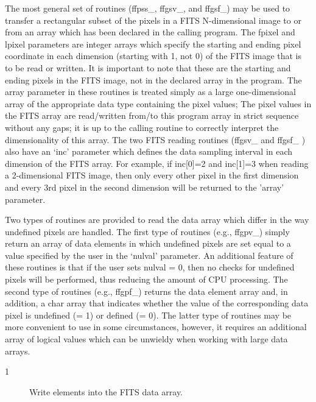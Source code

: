 \documentclass[11pt]{book}
\begin{document}
The most general set of routines (ffpss\_, ffgsv\_, and ffgsf\_) may be
used to transfer a rectangular subset of the pixels in a FITS
N-dimensional image to or from an array which has been declared in the
calling program.  The fpixel and lpixel parameters are integer arrays
which specify the starting and ending pixel coordinate in each dimension
(starting with 1, not 0) of the FITS image that is to be read or
written.  It is important to note that these are the starting and
ending pixels in the FITS image, not in the declared array in the
program. The array parameter in these routines is treated simply as a
large one-dimensional array of the appropriate data type containing the
pixel values; The pixel values in the FITS array are read/written
from/to this program array in strict sequence without any gaps;  it is
up to the calling routine to correctly interpret the dimensionality of
this array.  The two FITS reading routines (ffgsv\_ and ffgsf\_ ) also
have an `inc' parameter which defines the data sampling interval in
each dimension of the FITS array.  For example, if inc[0]=2 and
inc[1]=3 when reading a 2-dimensional FITS image, then only every other
pixel in the first dimension and every 3rd pixel in the second
dimension will be returned to the 'array' parameter.

Two types of routines are provided to read the data array which differ in
the way undefined pixels are handled.  The first type of routines (e.g.,
ffgpv\_) simply return an array of data elements in which undefined
pixels are set equal to a value specified by the user in the `nulval'
parameter.  An additional feature of these routines is that if the user
sets nulval = 0, then no checks for undefined pixels will be performed,
thus reducing the amount of CPU processing.  The second type of routines
(e.g., ffgpf\_) returns the data element array and, in addition, a char
array that indicates whether the value of the corresponding data pixel
is undefined (= 1) or defined (= 0).  The latter type of routines may
be more convenient to use in some circumstances, however, it requires
an additional array of logical values which can be unwieldy when working
with large data arrays.


\begin{description}
\item[1 ] Write elements into the FITS data array.
 \label{ffppr} \label{ffpprx} \label{ffppn} \label{ffppnx}
\end{description}
\end{document}
